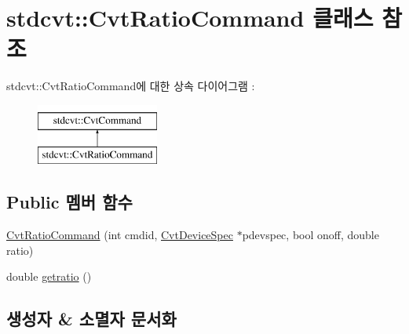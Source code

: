 \hypertarget{classstdcvt_1_1CvtRatioCommand}{}\section{stdcvt\+:\+:Cvt\+Ratio\+Command 클래스 참조}
\label{classstdcvt_1_1CvtRatioCommand}
stdcvt\+:\+:Cvt\+Ratio\+Command에 대한 상속 다이어그램 \+: \begin{figure}[H]
\begin{center}
\leavevmode
\includegraphics[height=2.000000cm]{classstdcvt_1_1CvtRatioCommand}
\end{center}
\end{figure}
\subsection*{Public 멤버 함수}
\begin{DoxyCompactItemize}
\item 
\hyperlink{classstdcvt_1_1CvtRatioCommand_a5bb6b4eb195f659cab02a613f206b075}{Cvt\+Ratio\+Command} (int cmdid, \hyperlink{classstdcvt_1_1CvtDeviceSpec}{Cvt\+Device\+Spec} $\ast$pdevspec, bool onoff, double ratio)
\item 
double \hyperlink{classstdcvt_1_1CvtRatioCommand_a4c16b3d69d2c85ee1efe889092c351b4}{getratio} ()
\end{DoxyCompactItemize}


\subsection{생성자 \& 소멸자 문서화}
